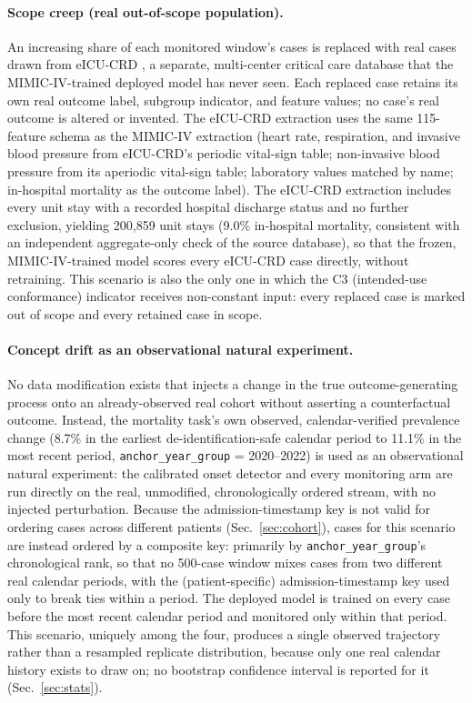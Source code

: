 \documentclass[apajournal,article,submit,oneauthor]{Definitions/mdpi}
\begin{document}
\paragraph{Scope creep (real out-of-scope population).}\label{sec:scopecreep} An increasing share of each monitored window's cases is replaced with real cases drawn from eICU-CRD \citep{pollard2018}, a separate, multi-center critical care database that the MIMIC-IV-trained deployed model has never seen. Each replaced case retains its own real outcome label, subgroup indicator, and feature values; no case's real outcome is altered or invented. The eICU-CRD extraction uses the same 115-feature schema as the MIMIC-IV extraction (heart rate, respiration, and invasive blood pressure from eICU-CRD's periodic vital-sign table; non-invasive blood pressure from its aperiodic vital-sign table; laboratory values matched by name; in-hospital mortality as the outcome label). The eICU-CRD extraction includes every unit stay with a recorded hospital discharge status and no further exclusion, yielding 200{,}859 unit stays (9.0\% in-hospital mortality, consistent with an independent aggregate-only check of the source database), so that the frozen, MIMIC-IV-trained model scores every eICU-CRD case directly, without retraining. This scenario is also the only one in which the C3 (intended-use conformance) indicator receives non-constant input: every replaced case is marked out of scope and every retained case in scope.

\paragraph{Concept drift as an observational natural experiment.}\label{sec:sc08} No data modification exists that injects a change in the true outcome-generating process onto an already-observed real cohort without asserting a counterfactual outcome. Instead, the mortality task's own observed, calendar-verified prevalence change (8.7\% in the earliest de-identification-safe calendar period to 11.1\% in the most recent period, \texttt{anchor\_year\_group} = 2020--2022) is used as an observational natural experiment: the calibrated onset detector and every monitoring arm are run directly on the real, unmodified, chronologically ordered stream, with no injected perturbation. Because the admission-timestamp key is not valid for ordering cases across different patients (Sec.~\ref{sec:cohort}), cases for this scenario are instead ordered by a composite key: primarily by \texttt{anchor\_year\_group}'s chronological rank, so that no 500-case window mixes cases from two different real calendar periods, with the (patient-specific) admission-timestamp key used only to break ties within a period. The deployed model is trained on every case before the most recent calendar period and monitored only within that period. This scenario, uniquely among the four, produces a single observed trajectory rather than a resampled replicate distribution, because only one real calendar history exists to draw on; no bootstrap confidence interval is reported for it (Sec.~\ref{sec:stats}).
\end{document}
